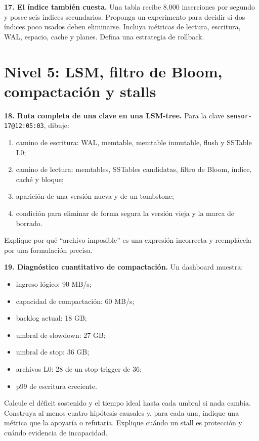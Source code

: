 \documentclass[variant=guia,cover=institutional,mode=screen]{ua-engineering-v6-article}
\begin{document}
\begin{uaexercise}
\textbf{17. El índice también cuesta.} Una tabla recibe 8.000 inserciones por segundo y posee seis índices secundarios. Proponga un experimento para decidir si dos índices poco usados deben eliminarse. Incluya métricas de lectura, escritura, WAL, espacio, cache y planes. Defina una estrategia de rollback.
\end{uaexercise}

\section{Nivel 5: LSM, filtro de Bloom, compactación y stalls}

\begin{uaexercise}
\textbf{18. Ruta completa de una clave en una LSM-tree.} Para la clave \texttt{sensor-17@12:05:03}, dibuje:

\begin{enumerate}
\item camino de escritura: WAL, memtable, memtable inmutable, flush y SSTable L0;
\item camino de lectura: memtables, SSTables candidatas, filtro de Bloom, índice, caché y bloque;
\item aparición de una versión nueva y de un tombstone;
\item condición para eliminar de forma segura la versión vieja y la marca de borrado.
\end{enumerate}

Explique por qué ``archivo imposible'' es una expresión incorrecta y reemplácela por una formulación precisa.
\end{uaexercise}

\begin{uaexercise}
\textbf{19. Diagnóstico cuantitativo de compactación.} Un dashboard muestra:

\begin{itemize}
\item ingreso lógico: 90 MB/s;
\item capacidad de compactación: 60 MB/s;
\item backlog actual: 18 GB;
\item umbral de slowdown: 27 GB;
\item umbral de stop: 36 GB;
\item archivos L0: 28 de un stop trigger de 36;
\item p99 de escritura creciente.
\end{itemize}

Calcule el déficit sostenido y el tiempo ideal hasta cada umbral si nada cambia. Construya al menos cuatro hipótesis causales y, para cada una, indique una métrica que la apoyaría o refutaría. Explique cuándo un stall es protección y cuándo evidencia de incapacidad.
\end{uaexercise}
\end{document}
